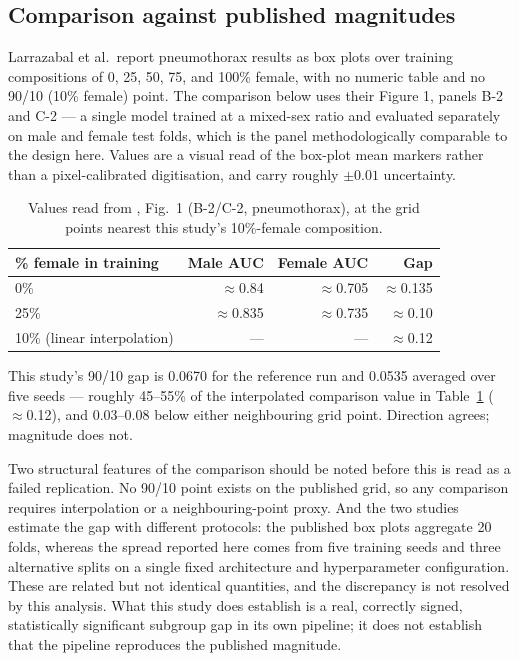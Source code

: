 \documentclass[11pt]{article}
\begin{document}
\subsection{Comparison against published magnitudes}
\label{sec:magnitude}

Larrazabal et al.\ report pneumothorax results as box plots over training compositions of 0, 25, 50, 75, and 100\% female, with no numeric table and no 90/10 (10\% female) point. The comparison below uses their Figure 1, panels B-2 and C-2 --- a single model trained at a mixed-sex ratio and evaluated separately on male and female test folds, which is the panel methodologically comparable to the design here. Values are a visual read of the box-plot mean markers rather than a pixel-calibrated digitisation, and carry roughly $\pm0.01$ uncertainty.

\begin{table}[H]
\centering
\begin{tabular}{lrrr}
\toprule
\% female in training & Male AUC & Female AUC & Gap \\
\midrule
0\%  & $\approx$0.84  & $\approx$0.705 & $\approx$0.135 \\
25\% & $\approx$0.835 & $\approx$0.735 & $\approx$0.10 \\
10\% (linear interpolation) & --- & --- & $\approx$0.12 \\
\bottomrule
\end{tabular}
\caption{Values read from \cite{larrazabal2020}, Fig.\ 1 (B-2/C-2, pneumothorax), at the grid points nearest this study's 10\%-female composition.}
\label{tab:larrazabal}
\end{table}

This study's 90/10 gap is 0.0670 for the reference run and 0.0535 averaged over five seeds --- roughly 45--55\% of the interpolated comparison value in Table~\ref{tab:larrazabal} ($\approx$0.12), and 0.03--0.08 below either neighbouring grid point. Direction agrees; magnitude does not.

Two structural features of the comparison should be noted before this is read as a failed replication. No 90/10 point exists on the published grid, so any comparison requires interpolation or a neighbouring-point proxy. And the two studies estimate the gap with different protocols: the published box plots aggregate 20 folds, whereas the spread reported here comes from five training seeds and three alternative splits on a single fixed architecture and hyperparameter configuration. These are related but not identical quantities, and the discrepancy is not resolved by this analysis. What this study does establish is a real, correctly signed, statistically significant subgroup gap in its own pipeline; it does not establish that the pipeline reproduces the published magnitude.
\end{document}
